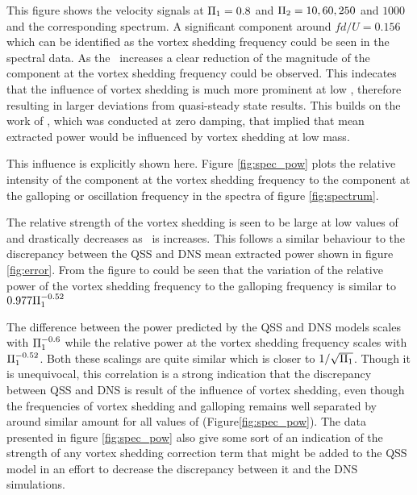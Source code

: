 



This figure shows the  velocity signals at $\Pi_1=0.8$ and $\Pi_2= 10, 60, 250$ and $1000$ and the corresponding spectrum. A significant component around $fd/U=0.156$ which can be identified as the vortex shedding frequency could be seen in the spectral data. As the \massstiff\ increases a clear reduction of the magnitude of the component at the  vortex shedding frequency could be observed. This indecates that the influence of vortex shedding is much more prominent at low \massstiff,  therefore resulting in larger deviations from quasi-steady state results. This builds on the work of \cite{Joly2012}, which was conducted at zero damping, that implied that mean extracted power would be influenced by vortex shedding at low mass.

This influence is explicitly shown here. Figure \ref{fig:spec_pow} plots the relative intensity of the component at the vortex shedding frequency to the component at the galloping or oscillation frequency in the spectra of figure \ref{fig:spectrum}.



The relative strength of the vortex shedding is seen to be large at low values of \massstiff and drastically decreases as \massstiff\ is increases. This follows a similar behaviour to the discrepancy between the QSS and DNS mean extracted power shown in figure \ref{fig:error}. From the figure to could be seen that the variation of the relative power of the vortex shedding frequency to the galloping frequency is similar to  $0.977\Pi_1^{-0.52}$ 

The difference between the power predicted by the QSS and DNS models scales with $\Pi_1^{-0.6}$ while the relative power at the vortex shedding frequency scales with $\Pi_1^{-0.52}$. Both these scalings are quite similar which is closer to $1/\sqrt{\Pi_1}$. Though it is unequivocal, this correlation is a strong indication that the discrepancy between QSS and DNS is result of the influence of vortex shedding, even though the frequencies of vortex shedding and galloping remains well separated by around similar amount for all values of \massstiff (Figure\ref{fig:spec_pow}). The data presented in figure \ref{fig:spec_pow} also give some sort of an indication of the strength of any vortex shedding correction term that might be added to the QSS model in an effort to decrease the discrepancy between it and the DNS simulations.

